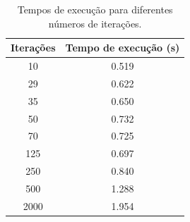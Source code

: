 \begin{enumerate}
\begin{table}[H]
        \centering
        \begin{tabular}{|c|c|}
                \hline
                Iterações & Tempo de execução (s) \\ \hline
                10 & 0.519 \\ \hline
                29 & 0.622 \\ \hline
                35 & 0.650 \\ \hline
                50 & 0.732 \\ \hline
                70 & 0.725 \\ \hline
                125 & 0.697 \\ \hline
                250 & 0.840 \\ \hline
                500 & 1.288 \\ \hline
                2000 & 1.954 \\ \hline
        \end{tabular}
        \caption{Tempos de execução para diferentes números de iterações.}
\end{table}


\end{enumerate}
